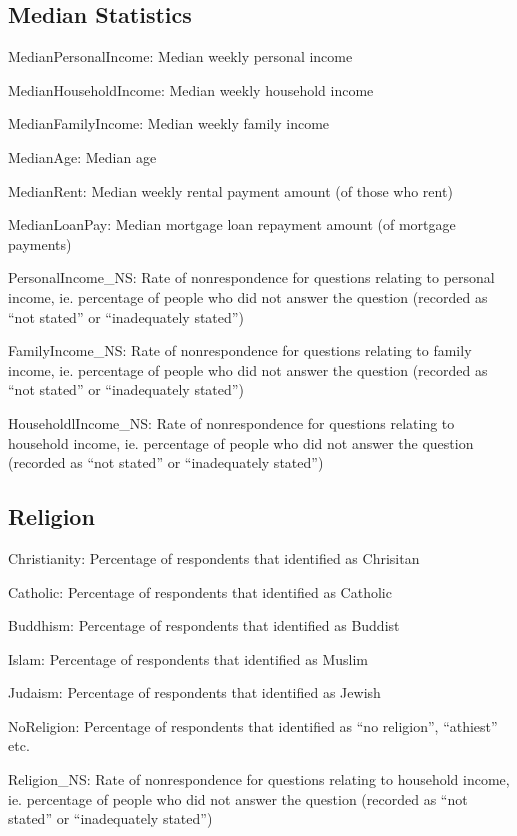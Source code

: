 \documentclass{monashthesis}
\theoremstyle{definition}
\theoremstyle{definition}
\theoremstyle{definition}
\theoremstyle{remark}
\begin{document}
\subsection{Median Statistics}\label{median-statistics}

MedianPersonalIncome: Median weekly personal income

MedianHouseholdIncome: Median weekly household income

MedianFamilyIncome: Median weekly family income

MedianAge: Median age

MedianRent: Median weekly rental payment amount (of those who rent)

MedianLoanPay: Median mortgage loan repayment amount (of mortgage
payments)

PersonalIncome\_NS: Rate of nonrespondence for questions relating to
personal income, ie. percentage of people who did not answer the
question (recorded as ``not stated'' or ``inadequately stated'')

FamilyIncome\_NS: Rate of nonrespondence for questions relating to
family income, ie. percentage of people who did not answer the question
(recorded as ``not stated'' or ``inadequately stated'')

HouseholdlIncome\_NS: Rate of nonrespondence for questions relating to
household income, ie. percentage of people who did not answer the
question (recorded as ``not stated'' or ``inadequately stated'')

\subsection{Religion}\label{religion}

Christianity: Percentage of respondents that identified as Chrisitan

Catholic: Percentage of respondents that identified as Catholic

Buddhism: Percentage of respondents that identified as Buddist

Islam: Percentage of respondents that identified as Muslim

Judaism: Percentage of respondents that identified as Jewish

NoReligion: Percentage of respondents that identified as ``no
religion'', ``athiest'' etc.

Religion\_NS: Rate of nonrespondence for questions relating to household
income, ie. percentage of people who did not answer the question
(recorded as ``not stated'' or ``inadequately stated'')
\end{document}
